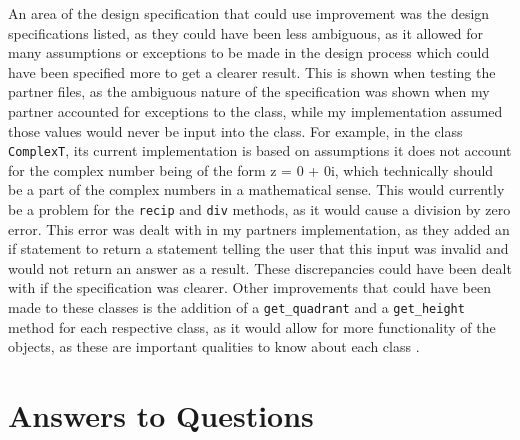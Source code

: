 \documentclass[12pt]{article}
\begin{document}
An area of the design specification that could use improvement was the design 
specifications listed, as they could have been less ambiguous, as it allowed 
for many assumptions or exceptions to be made in the design process which 
could have been specified more to get a clearer result. This is shown when 
testing the partner files, as the ambiguous nature of the specification was 
shown when my partner accounted for exceptions to the class, while my 
implementation assumed those values would never be input into the class. 
For example, in the class \verb|ComplexT|, its current implementation is 
based on assumptions it does not account for the complex number being of 
the form z = 0 + 0i, which technically should be a part of the complex 
numbers in a mathematical sense. This would currently be a problem for the 
\verb|recip| and \verb|div| methods, as it would cause a division by zero 
error. This error was dealt with in my partners implementation, as they 
added an if statement to return a statement telling the user that this input 
was invalid and would not return an answer as a result. These discrepancies 
could have been dealt with if the specification was clearer. Other improvements 
that could have been made to these classes is the addition of a 
\verb|get_quadrant| and a \verb|get_height| method for each respective class, 
as it would allow for more functionality of the objects, as these are important 
qualities to know about each class . 

\section{Answers to Questions}
\end{document}
